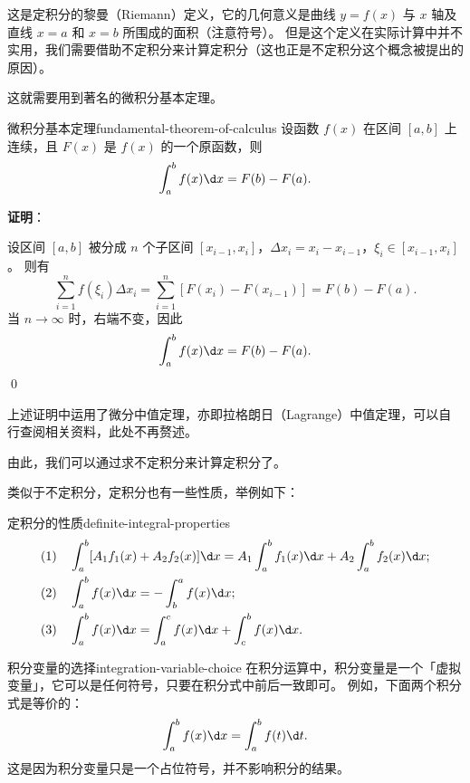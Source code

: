 这是定积分的黎曼（Riemann）定义，它的几何意义是曲线 $ y = f(x) $ 与 $ x $ 轴及直线 $ x = a $ 和 $ x = b $ 所围成的面积（注意符号）。
但是这个定义在实际计算中并不实用，我们需要借助不定积分来计算定积分（这也正是不定积分这个概念被提出的原因）。

这就需要用到著名的微积分基本定理。

\begin{theorem}{微积分基本定理}{fundamental-theorem-of-calculus}
    设函数 $ f(x) $ 在区间 $ [a, b] $ 上连续，且 $ F(x) $ 是 $ f(x) $ 的一个原函数，则
    \begin{equation}
        \int_a^b f(x) \d x = F(b) - F(a).
    \end{equation}

    \textbf{证明}：

    设区间 $ [a, b] $ 被分成 $ n $ 个子区间 $ [x_{i-1}, x_i] $，$ \Delta x_i = x_i - x_{i-1} $，$ \xi_i \in [x_{i-1}, x_i] $。
    则有
    \begin{equation*}
        \sum_{i=1}^n f(\xi_i) \Delta x_i = \sum_{i=1}^n [F(x_i) - F(x_{i-1})] = F(b) - F(a).
    \end{equation*}
    当 $ n \to \infty $ 时，右端不变，因此
    \begin{equation*}
        \int_a^b f(x) \d x = F(b) - F(a).
    \end{equation*}
    \qed

    上述证明中运用了微分中值定理，亦即拉格朗日（Lagrange）中值定理，可以自行查阅相关资料，此处不再赘述。
\end{theorem}

由此，我们可以通过求不定积分来计算定积分了。

类似于不定积分，定积分也有一些性质，举例如下：
\begin{physlist}{定积分的性质}{definite-integral-properties}
    \begin{align}
         & (1)\quad \int_a^b [A_1 f_1(x) + A_2 f_2(x)] \d x = A_1 \int_a^b f_1(x) \d x + A_2 \int_a^b f_2(x) \d x ; \\
         & (2)\quad \int_a^b f(x) \d x = -\int_b^a f(x) \d x ;                                                      \\
         & (3)\quad \int_a^b f(x) \d x = \int_a^c f(x) \d x + \int_c^b f(x) \d x .
    \end{align}
\end{physlist}

\begin{note}{积分变量的选择}{integration-variable-choice}
    在积分运算中，积分变量是一个「虚拟变量」，它可以是任何符号，只要在积分式中前后一致即可。
    例如，下面两个积分式是等价的：
    \begin{equation*}
        \int_a^b f(x) \d x = \int_a^b f(t) \d t .
    \end{equation*}
    这是因为积分变量只是一个占位符号，并不影响积分的结果。
\end{note}

